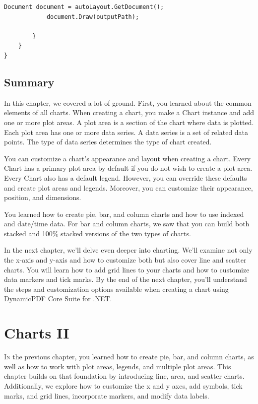 \documentclass[american,letterpaper]{tufte-book}
\numberwithin{equation}{section}
\numberwithin{figure}{section}
\def\color#1{}%
\begin{document}
{\begin{lstlisting}[caption={Using AutoLayout to create a PDF document.},label={lis:autolayout-chart},basicstyle={\small\ttfamily},breaklines=true]
            Document document = autoLayout.GetDocument();
            document.Draw(outputPath);

        }
    }
}
\end{lstlisting}
\leavevmode\egroup


\section{Summary}

In this chapter, we covered a lot of ground. First, you learned about
the common elements of all charts. When creating a chart, you make
a Chart instance and add one or more plot areas. A plot area is a
section of the chart where data is plotted. Each plot area has one
or more data series. A data series is a set of related data points.
The type of data series determines the type of chart created. 

You can customize a chart's appearance and layout when creating a
chart. Every Chart has a primary plot area by default if you do not
wish to create a plot area. Every Chart also has a default legend.
However, you can override these defaults and create plot areas and
legends. Moreover, you can customize their appearance, position, and
dimensions. 

You learned how to create pie, bar, and column charts and how to use
indexed and date/time data. For bar and column charts, we saw that
you can build both stacked and 100\% stacked versions of the two types
of charts.

In the next chapter, we'll delve even deeper into charting. We'll
examine not only the x-axis and y-axis and how to customize both but
also cover line and scatter charts. You will learn how to add grid
lines to your charts and how to customize data markers and tick marks.
By the end of the next chapter, you'll understand the steps and customization
options available when creating a chart using DynamicPDF Core
Suite for .NET.

\color{white}
\chapter{Charts II}\label{chap:Charts-II}
\color{black}
\BgThispage
\vspace{8.00em}
\lettrine[lines=2,lhang=0.1]{I}{n} the previous chapter, you learned how to create pie, bar, and column charts, as well as how to work with plot areas, legends, and multiple plot areas. This chapter builds on that foundation by introducing line, area, and scatter charts. Additionally, we explore how to customize the x and y axes, add symbols, tick marks, and grid lines, incorporate markers, and modify data labels.

}
\end{document}
